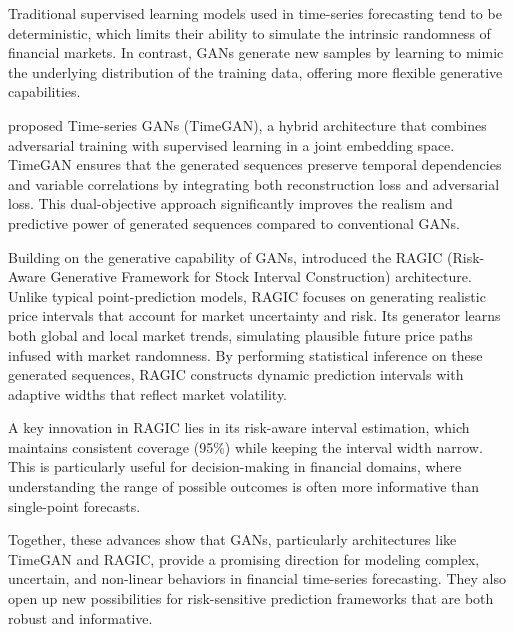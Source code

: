 Traditional supervised learning models used in time-series forecasting tend to be deterministic, which limits their ability to simulate the intrinsic randomness of financial markets. In contrast, GANs generate new samples by learning to mimic the underlying distribution of the training data, offering more flexible generative capabilities.

\textcite{yoon_time-series_nodate} proposed Time-series GANs (TimeGAN), a hybrid architecture that combines adversarial training with supervised learning in a joint embedding space. TimeGAN ensures that the generated sequences preserve temporal dependencies and variable correlations by integrating both reconstruction loss and adversarial loss. This dual-objective approach significantly improves the realism and predictive power of generated sequences compared to conventional GANs.

Building on the generative capability of GANs, \textcite{gu_ragic_2025} introduced the RAGIC (Risk-Aware Generative Framework for Stock Interval Construction) architecture. Unlike typical point-prediction models, RAGIC focuses on generating realistic price intervals that account for market uncertainty and risk. Its generator learns both global and local market trends, simulating plausible future price paths infused with market randomness. By performing statistical inference on these generated sequences, RAGIC constructs dynamic prediction intervals with adaptive widths that reflect market volatility.

A key innovation in RAGIC lies in its risk-aware interval estimation, which maintains consistent coverage (95\%) while keeping the interval width narrow. This is particularly useful for decision-making in financial domains, where understanding the range of possible outcomes is often more informative than single-point forecasts.

Together, these advances show that GANs, particularly architectures like TimeGAN and RAGIC, provide a promising direction for modeling complex, uncertain, and non-linear behaviors in financial time-series forecasting. They also open up new possibilities for risk-sensitive prediction frameworks that are both robust and informative.

